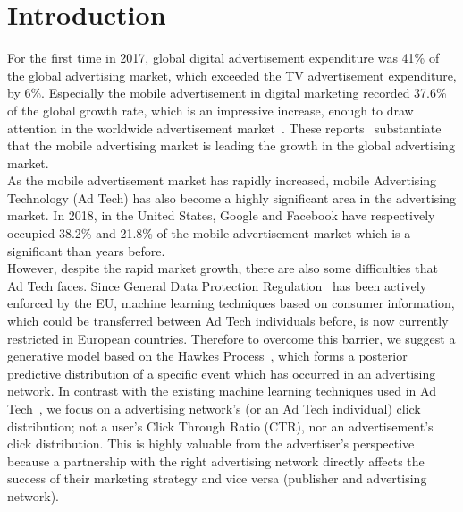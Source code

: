\documentclass[10pt,letterpaper]{article}
\begin{document}
\section*{Introduction}
For the first time in 2017, global digital advertisement expenditure was 41\% of the global advertising market, which exceeded the TV advertisement expenditure, by 6\%. Especially the mobile advertisement in digital marketing recorded 37.6\% of the global growth rate, which is an impressive increase, enough to draw attention in the worldwide advertisement market~\cite{bib1}. These reports~\cite{bib2,bib3,bib4} substantiate that the mobile advertising market is leading the growth in the global advertising market.\\
As the mobile advertisement market has rapidly increased, mobile Advertising Technology (Ad Tech) has also become a highly significant area in the advertising market. In 2018, in the United States, Google and Facebook have respectively occupied 38.2\% and 21.8\% of the mobile advertisement market which is a significant than years before.\\
	However, despite the rapid market growth, there are also some difficulties that Ad Tech faces. Since General Data Protection Regulation~\cite{bib5} has been actively enforced by the EU, machine learning techniques based on consumer information, which could be transferred between Ad Tech individuals before, is now currently restricted in European countries. Therefore to overcome this barrier, we suggest a generative model based on the Hawkes Process~\cite{bib6}, which forms a posterior predictive distribution of a specific event which has occurred in an advertising network. In contrast with the existing machine learning techniques used in Ad Tech~\cite{bib7, bib8}, we focus on a advertising network's (or an Ad Tech individual) click distribution; not a user’s Click Through Ratio (CTR), nor an advertisement’s click distribution. This is highly valuable from the advertiser’s perspective because a partnership with the right advertising network directly affects the success of their marketing strategy and vice versa (publisher and advertising network).\\
\end{document}
